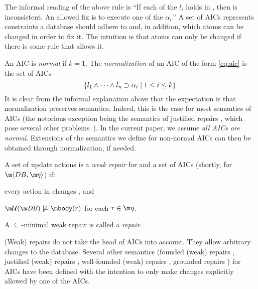 The informal reading of the above rule is ``If each of the $l_i$ holds in \db, then \db is inconsistent. An allowed fix is to execute one of the $\alpha_i$.''
A set of AICs represents constraints a database should adhere to and, in addition, which atoms can be changed in order to fix it. The intuition is that atoms can only be changed if there is some rule that allows it. 


An AIC is \emph{normal} if $k=1$. The \emph{normalization} of an AIC of the form \eqref{eq:aic} is the set of AICs 
\[\{l_1\land \dots\land l_n\supset \alpha_i\mid 1\leq i\leq k\}.\]
It is clear from the informal explanation above that the expectation is that normalization preserves semantics. Indeed, this is the case for most semantics of AICs (the notorious exception being the semantics of justified repairs \cite{tplp/CaropreseT11}, which pose several other problems~\cite{tase/Cruz-FilipeEGN13}).
In the current paper, we assume \emph{all AICs are normal}. Extensions of the semantics we define for non-normal AICs can then be obtained through normalization, if needed. 

\begin{definition}
 A set of update actions \UU is a \emph{weak repair} for \db and a set \aics of AICs (shortly, for $\fulldb$) if:
 \begin{compactitem}
  \item every action in \UU changes \db, and 
  \item $\UU(\db)\not\models \body(r)$ for each $r\in\aics$.
 \end{compactitem}
A $\subseteq$-minimal weak repair is called a \emph{repair}.
\end{definition}

(Weak) repairs do not take the head of AICs into account. They allow arbitrary changes to the database. Several other semantics (founded (weak) repairs \cite{iclp/CaropreseGSZ06}, justified (weak) repairs \cite{tplp/CaropreseT11}, well-founded (weak) repairs \cite{tase/Cruz-FilipeEGN13}, grounded repairs \cite{iclp/Cruz-Filipe16}) for AICs have been defined with the intention to only make changes explicitly allowed by one of the AICs. 

%  


